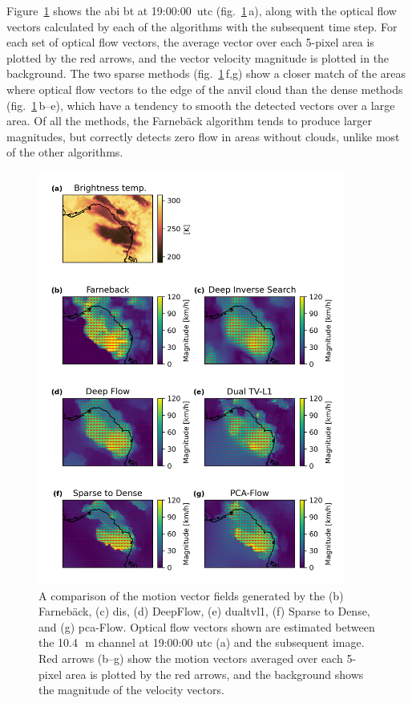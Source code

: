 Figure~\ref{fig:opt_flow_comparison} shows the \acrshort{abi} \acrshort{bt} at 19:00:00~\acrshort{utc} (fig.~\ref{fig:opt_flow_comparison}\,a), along with the optical flow vectors calculated by each of the algorithms with the subsequent time step.
For each set of optical flow vectors, the average vector over each 5-pixel area is plotted by the red arrows, and the vector velocity magnitude is plotted in the background.
The two sparse methods (fig.~\ref{fig:opt_flow_comparison}\,f,g) show a closer match of the areas where optical flow vectors to the edge of the anvil cloud than the dense methods (fig.~\ref{fig:opt_flow_comparison}\,b--e), which have a tendency to smooth the detected vectors over a large area.
Of all the methods, the Farnebäck algorithm tends to produce larger magnitudes, but correctly detects zero flow in areas without clouds, unlike most of the other algorithms.


\begin{figure}[tp]
    \centering
    \includegraphics[width=0.9\textwidth]{figures/chapter1_10.png}
    \caption[
    A comparison of the motion vector fields generated by different optical flow methods
    ]{
    A comparison of the motion vector fields generated by the (b) Farnebäck, (c) \acrshort{dis}, (d) DeepFlow, (e) \acrshort{dualtvl1}, (f) Sparse to Dense, and (g) \acrshort{pca}-Flow. Optical flow vectors shown are estimated between the 10.4\,\unit{\mu m} channel at 19:00:00 \acrshort{utc} (a) and the subsequent image. Red arrows (b--g) show the motion vectors averaged over each 5-pixel area is plotted by the red arrows, and the background shows the magnitude of the velocity vectors.
    }
    \label{fig:opt_flow_comparison}
\end{figure}


